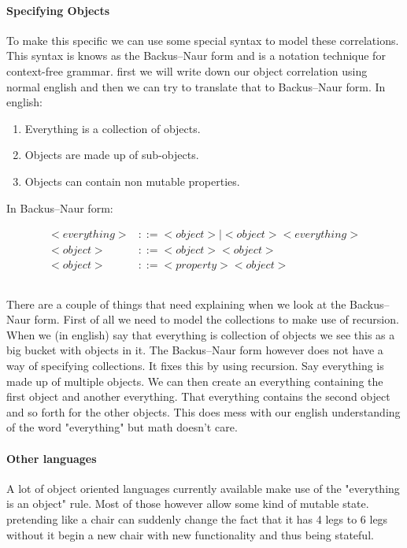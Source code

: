 \documentclass{scrartcl}
\begin{document}
    \paragraph{Specifying Objects}
    To make this specific we can use some special syntax to model these correlations.
    This syntax is knows as the Backus–Naur form and is a notation technique for context-free
    grammar. first we will write down our object correlation using normal english and then we
    can try to translate that to Backus–Naur form.
    \newline
    In english:
    \begin{enumerate}
        \item Everything is a collection of objects.
        \item Objects are made up of sub-objects.
        \item Objects can contain non mutable properties.
    \end{enumerate}

    In Backus–Naur form:

    \begin{align*}
         <everything> &::= <object> | <object><everything> \\
         <object> &::= <object><object> \\
         <object> &::= <property><object> \\
    \end{align*}

    \subparagraph{}
    There are a couple of things that need explaining when we look
    at the Backus–Naur form. First of all we need to model the collections
    to make use of recursion. When we (in english) say that everything is 
    collection of objects we see this as a big bucket with objects in it.
    The Backus–Naur form however does not have a way of specifying 
    collections. It fixes this by using recursion. Say everything is
    made up of multiple objects. We can then create an everything containing the 
    first object and another everything. That everything contains the second
    object and so forth for the other objects. This does mess with our english
    understanding of the word "everything" but math doesn't care.

    \paragraph{Other languages}
    A lot of object oriented languages currently available make use of the
    "everything is an object" rule. Most of those however allow some kind of
    mutable state. pretending like a chair can suddenly change the fact that
    it has 4 legs to 6 legs without it begin a new chair with new
    functionality and thus being stateful. 
\end{document}
